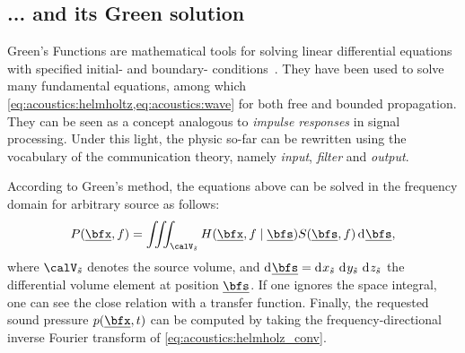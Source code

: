 \subsection{... and its Green solution}
Green's Functions are mathematical tools for solving linear differential equations with specified initial- and boundary- conditions~.
They have been used to solve many fundamental equations, among which \cref{eq:acoustics:helmholtz,eq:acoustics:wave} for both free and bounded propagation.
They can be seen as a concept analogous to \emph{impulse responses} in signal processing.
Under this light, the physic so-far can be rewritten using the vocabulary of the communication theory, namely \textit{input}, \textit{filter} and \textit{output}.

\mynewline
According to Green's method, the equations above can be solved in the frequency domain for arbitrary source as follows:
\begin{equation}
    \label{eq:acoustics:helmholz_conv}
    P(\positionMicrophone, f) = \iiint_{\volume_{\contSource}} H(\positionMicrophone, f \mid \positionSource) S(\positionSource, f) \kdiff\positionSource
    ,
\end{equation}
where $\volume_{\contSource}$ denotes the source volume,
and  $\kdiff\positionSource =  \kdiff{x_{\contSource}}\,\kdiff{y_{\contSource}}\,\kdiff{z_{\contSource}}$ the  differential  volume element at position $\positionSource$.
If one ignores the space integral, one can see the close relation with a transfer function.
Finally, the requested sound pressure $\pressureSpaceTime$ can be computed by taking the frequency-directional inverse Fourier transform of \cref{eq:acoustics:helmholz_conv}.

